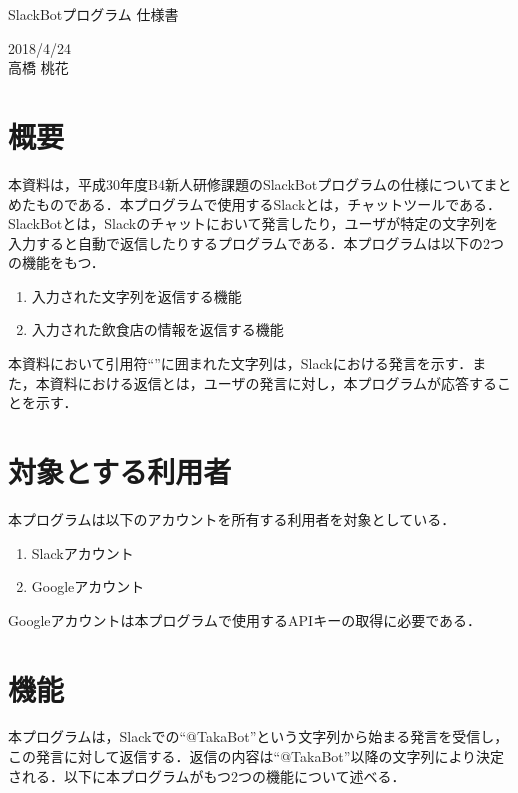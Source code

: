\documentclass[12pt]{jsarticle}
\begin{document}
\begin{center}
{\LARGE SlackBotプログラム 仕様書}
\end{center}

\begin{flushright}
  2018/4/24\\
  高橋 桃花
\end{flushright}
\section{概要}
\label{sec:introduction}
本資料は，平成30年度B4新人研修課題のSlackBotプログラムの仕様についてまとめたものである．本プログラムで使用するSlack\cite{slack}とは，チャットツールである．SlackBotとは，Slackのチャットにおいて発言したり，ユーザが特定の文字列を入力すると自動で返信したりするプログラムである．本プログラムは以下の2つの機能をもつ．

\begin{enumerate}
\item 入力された文字列を返信する機能
\item 入力された飲食店の情報を返信する機能
\end{enumerate}
本資料において引用符``''に囲まれた文字列は，Slackにおける発言を示す．また，本資料における返信とは，ユーザの発言に対し，本プログラムが応答することを示す．

\section{対象とする利用者}
\label{sec:target_users}
本プログラムは以下のアカウントを所有する利用者を対象としている．

\begin{enumerate}
\item Slackアカウント
\item Googleアカウント
\end{enumerate}
Googleアカウントは本プログラムで使用するAPIキーの取得に必要である．

\section{機能}
\label{sec:function}
本プログラムは，Slackでの``@TakaBot''という文字列から始まる発言を受信し，この発言に対して返信する．返信の内容は``@TakaBot''以降の文字列により決定される．以下に本プログラムがもつ2つの機能について述べる．
\end{document}
